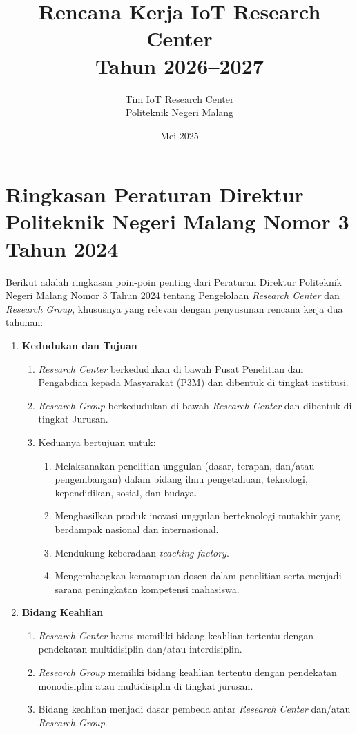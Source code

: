 \documentclass[12pt,a4paper]{article}
\title{Rencana Kerja IoT Research Center \\ Tahun 2026--2027}
\author{Tim IoT Research Center \\ Politeknik Negeri Malang}
\date{Mei 2025}
\begin{document}
\maketitle

\section{Ringkasan Peraturan Direktur Politeknik Negeri Malang Nomor 3 Tahun 2024}

Berikut adalah ringkasan poin-poin penting dari Peraturan Direktur Politeknik Negeri Malang Nomor 3 Tahun 2024 tentang Pengelolaan \textit{Research Center} dan \textit{Research Group}, khususnya yang relevan dengan penyusunan rencana kerja dua tahunan:

\begin{enumerate}[leftmargin=*]
    \item \textbf{Kedudukan dan Tujuan}
          \begin{enumerate}
              \item \textit{Research Center} berkedudukan di bawah Pusat Penelitian dan Pengabdian kepada Masyarakat (P3M) dan dibentuk di tingkat institusi.
              \item \textit{Research Group} berkedudukan di bawah \textit{Research Center} dan dibentuk di tingkat Jurusan.
              \item Keduanya bertujuan untuk:
                    \begin{enumerate}
                        \item Melaksanakan penelitian unggulan (dasar, terapan, dan/atau pengembangan) dalam bidang ilmu pengetahuan, teknologi, kependidikan, sosial, dan budaya.
                        \item Menghasilkan produk inovasi unggulan berteknologi mutakhir yang berdampak nasional dan internasional.
                        \item Mendukung keberadaan \textit{teaching factory}.
                        \item Mengembangkan kemampuan dosen dalam penelitian serta menjadi sarana peningkatan kompetensi mahasiswa.
                    \end{enumerate}
          \end{enumerate}

    \item \textbf{Bidang Keahlian}
          \begin{enumerate}
              \item \textit{Research Center} harus memiliki bidang keahlian tertentu dengan pendekatan multidisiplin dan/atau interdisiplin.
              \item \textit{Research Group} memiliki bidang keahlian tertentu dengan pendekatan monodisiplin atau multidisiplin di tingkat jurusan.
              \item Bidang keahlian menjadi dasar pembeda antar \textit{Research Center} dan/atau \textit{Research Group}.
          \end{enumerate}


\end{enumerate}
\end{document}

